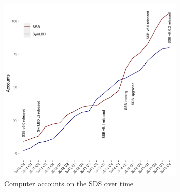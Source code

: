 \documentclass[inline]{hdsr} %
\providecommand{\DIFaddbeginFL}{} %
\providecommand{\DIFaddendFL}{} %
\providecommand{\DIFdelbeginFL}{} %
\providecommand{\DIFdelendFL}{} %
\begin{document}
\begin{figure}
    \centering
    \DIFdelbeginFL %
\DIFdelendFL \DIFaddbeginFL \includegraphics[width=0.8\textwidth]{accounts-2015.png}
    \DIFaddendFL \caption{Computer accounts on the SDS over time}
    \label{fig:growth_in_sds}
\end{figure}
\end{document}
